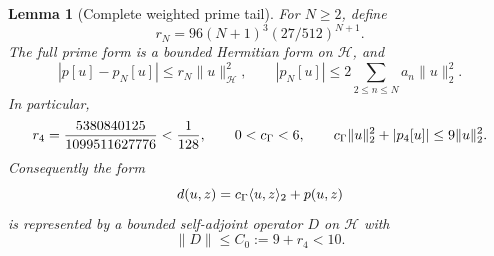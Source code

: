 \documentclass[11pt,a4paper]{article}
\numberwithin{equation}{section}
\newtheorem{lemma}[theorem]{Lemma}
\theoremstyle{definition}\newtheorem{definition}[theorem]{Definition}
\theoremstyle{remark}\newtheorem{remark}[theorem]{Remark}
\newcommand{\Hh}{\mathcal H}\newcommand{\Hw}{\mathcal H}
\newcommand{\ip}[2]{\langle#1,#2\rangle}\newcommand{\norm}[1]{\lVert#1\rVert}\newcommand{\abs}[1]{\lvert#1\rvert}
\begin{document}
\begin{lemma}[Complete weighted prime tail]\label{a:lem:prime}
For $N\ge2$, define
\begin{equation}\label{a:eq:rN}
 r_N=96(N+1)^3(27/512)^{N+1}.
\end{equation}
The full prime form is a bounded Hermitian form on $\Hw$, and
\begin{equation}\label{a:eq:headtail}
 |p[u]-p_N[u]|\le r_N\norm u_{\Hh}^2,
 \qquad |p_N[u]|\le2\sum_{2\le n\le N}a_n\norm u_2^2.
\end{equation}
In particular,
\begin{equation}\label{a:eq:head4}
 r_4=\frac{5380840125}{1099511627776}<\frac1{128},
 \qquad 0<\cg<6,
 \qquad \cg\norm u_2^2+|p_4[u]|\le9\norm u_2^2.
\end{equation}
Consequently the form
\begin{equation}\label{a:eq:Dform}
 d(u,z)=\cg\ip uz_2+p(u,z)
\end{equation}
is represented by a bounded self-adjoint operator $D$ on $\Hw$ with
\begin{equation}\label{a:eq:C0}
 \norm D\le C_0:=9+r_4<10.
\end{equation}
\end{lemma}
\end{document}
